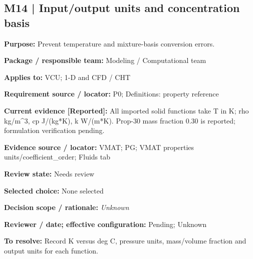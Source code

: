 \documentclass[11pt]{article}
\begin{document}
\par\noindent\begin{minipage}{\textwidth}\small\setlength{\parskip}{2pt}
\subsection*{M14 | Input/output units and concentration basis}
\textbf{Purpose:} Prevent temperature and mixture-basis conversion errors.\par
\textbf{Package / responsible team:} Modeling / Computational team\par
\textbf{Applies to:} VCU; 1-D and CFD / CHT\par
\textbf{Requirement source / locator:} P0; Definitions: property reference\par
\textbf{Current evidence [Reported]:} All imported solid functions take T in K; rho kg/m\textasciicircum{}3, cp J/(kg*K), k W/(m*K). Prop-30 mass fraction 0.30 is reported; formulation verification pending.\par
\textbf{Evidence source / locator:} VMAT; PG; VMAT properties units/coefficient\_\allowbreak{}order; Fluids tab\par
\textbf{Review state:} Needs review\par
\textbf{Selected choice:} None selected\par
\textbf{Decision scope / rationale:} \textit{Unknown}\par
\textbf{Reviewer / date; effective configuration:} Pending; Unknown\par
\textbf{To resolve:} Record K versus deg C, pressure units, mass/volume fraction and output units for each function.\par
\end{minipage}\par\vspace{5pt}
\end{document}
